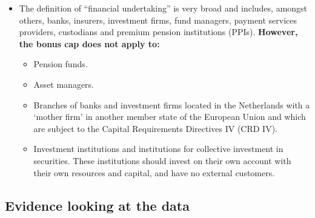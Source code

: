 \documentclass[12pt]{article}
\begin{document}
\begin{itemize}
		\item The definition of ``financial undertaking'' is very broad and includes, amongst others, banks, insurers, investment firms, fund managers, payment services providers, custodians and premium pension institutions (PPIs). \textbf{However, the bonus cap does not apply to:}
		\begin{itemize}
			\item Pension funds.
			\item Asset managers.
			\item  Branches of banks and investment
			firms located in the Netherlands with a
			‘mother firm’ in another member state
			of the European Union and which are
			subject to the Capital Requirements
			Directives IV (CRD IV).
			\item Investment institutions and institutions
			for collective investment in securities.
			These institutions should invest on their
			own account with their own resources
			and capital, and have no external
			customers.
		\end{itemize}
		
	\end{itemize}
	
	
\subsection{Evidence looking at the data}
	
\end{document}
